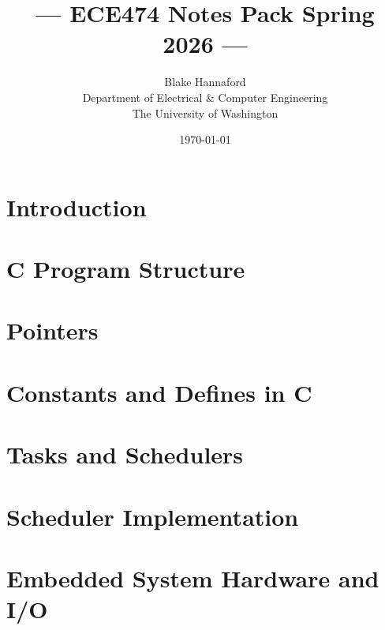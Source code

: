 \documentclass[letterpaper]{book}
\begin{document}
\title{--- ECE474 Notes Pack Spring 2026 ---}

\author{
        Blake Hannaford\\
        Department of Electrical \& Computer Engineering \\
        The University of Washington
}

%
%
%
%

\date{\today}

\maketitle

\tableofcontents

\chapter{Introduction}
    
\chapter{C Program Structure}
    
\chapter{Pointers}
    
\chapter{Constants and Defines in C}
    
\chapter{Tasks and Schedulers}
    
    
\chapter{Scheduler Implementation}
    
\chapter{Embedded System Hardware and I/O}
    
\end{document}

